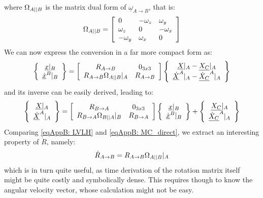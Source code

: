 	\noindent where $\Omega_{A\vert \vert B}$ is the matrix dual form of $\underline{\omega}_{A \to B}$, that is:
	\[
	\Omega_{A\vert \vert B} = \left[ \begin{array}{lll}
			0 			& -\omega_z & \omega_y \\
			\omega_z 	& 0 		& -\omega_x \\
			-\omega_y 	& \omega_x 	& 0
			\end{array}\right]
	\]
	\indent We can now express the conversion in a far more compact form as:
	\begin{equation}
	\left\{ \begin{array}{c}
	\underline{x}\rvert_{B} \\
	\underline{\dot{x}}^{B}\rvert_{B}
	\end{array} \right\}
	= 
	\left[\begin{array}{cc}
	R_{A\to B} 								& 0_{3x3} \\
	R_{A\to B} \Omega_{A \vert \vert B} \rvert_{A} & R_{A\to B} 
	\end{array}\right]
	\left\{ \begin{array}{c}
	\underline{X}\rvert_{A} - \underline{X_C}\rvert_{A}\\
	\underline{\dot{X}}^{A}\rvert_{A} - \underline{\dot{X}_C}^{A}\rvert_{A}
	\end{array}\right\}
	\label{eqAppB: 	MC_direct}
	\end{equation}
	\noindent and its inverse can be easily derived, leading to:
	\begin{equation}
	\left\{ \begin{array}{c}
	\underline{X}\rvert_{A} \\
	\underline{\dot{X}}^{A}\rvert_{A}
	\end{array} \right\}
	= 
	\left[\begin{array}{cc}
	R_{B\to A} & 0_{3x3} \\
	R_{B\to A} \Omega_{B\vert \vert A} \rvert_{B} & R_{B\to A} 
	\end{array}\right]
	\left\{ \begin{array}{c}
	\underline{x}\rvert_{B} \\
	\underline{\dot{x}}^{B}\rvert_{B}
	\end{array}\right\} + 
	\left\{ \begin{array}{c}
	\underline{X_C}\rvert_{A} \\
	\underline{\dot{X}_C}^{A}\rvert_{A}
	\end{array} \right\}
	\label{eqAppB: 	MC_inverse}
	\end{equation}
	\indent Comparing \eqref{eqAppB: 	LVLH} and \eqref{eqAppB: 	MC_direct}, we extract an interesting property of $\dot{R}$, namely:
	\[
	\dot{R}_{A \to B} = R_{A\to B} \Omega_{A \vert \vert B} \rvert_{A}
	\]
	\noindent which is in turn quite useful, as time derivation of the rotation matrix itself might be quite costly and symbolically dense. This requires though to know the angular velocity vector, whose calculation might not be easy.
